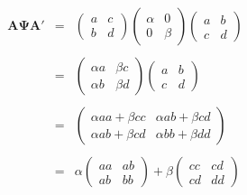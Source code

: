 \documentclass{ltjsbook}
\begin{document}
\[
	\begin{array}{lll}
		\bm{A\Psi A}' & = & \begin{pmatrix} a & c\\ b & d \end{pmatrix}\begin{pmatrix}\alpha & 0\\ 0&\beta \end{pmatrix}\begin{pmatrix}a & b\\ c & d \end{pmatrix} \\
		              &   &                                                                                                                                        \\
		              & = & \begin{pmatrix} \alpha a & \beta c \\ \alpha b & \beta d \end{pmatrix}
		\begin{pmatrix}a & b\\ c & d \end{pmatrix}                                                                                                                 \\
		              &   &                                                                                                                                        \\
		              & = & \begin{pmatrix} \alpha aa + \beta cc & \alpha ab + \beta cd \\
                \alpha ab + \beta cd & \alpha bb + \beta dd\end{pmatrix}                                                                            \\
		              &                                                                                                                                            \\
		              & = & \alpha \begin{pmatrix} aa & ab\\ ab & bb \end{pmatrix} +
		\beta \begin{pmatrix}cc & cd \\ cd & dd \end{pmatrix}                                                                                                      \\

\end{array}\]
\end{document}
